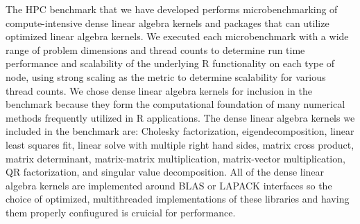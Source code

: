 The HPC benchmark that we have developed performs microbenchmarking of compute-intensive
dense linear algebra kernels and packages that can utilize optimized linear algebra
kernels. We executed each microbenchmark with a wide range of problem dimensions and
thread counts to determine run time performance and scalability of the underlying R
functionality on each type of node, using strong scaling as the metric to determine
scalability for various thread counts. We chose dense linear algebra kernels for inclusion
in the benchmark because they form the computational foundation of many numerical methods
frequently utilized in R applications. The dense linear algebra kernels we included in the
benchmark are: Cholesky factorization, eigendecomposition, linear least squares fit,
linear solve with multiple right hand sides, matrix cross product, matrix determinant,
matrix-matrix multiplication, matrix-vector multiplication, QR factorization, and singular
value decomposition. All of the dense linear algebra kernels are implemented around BLAS
or LAPACK interfaces so the choice of optimized, multithreaded implementations of these
libraries and having them properly confiugured is cruicial for performance.


